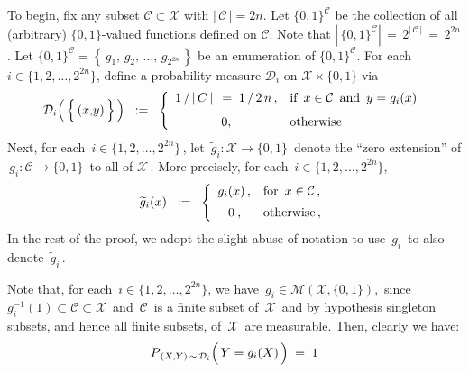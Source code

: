 \vskip 0.5cm
\noindent
To begin, fix any subset $\mathcal{C} \subset \mathcal{X}$ with $\vert\,\mathcal{C}\,\vert = 2n$.
Let $\{0,1\}^{\mathcal{C}}$ be the collection of all (arbitrary) $\{0,1\}$-valued functions defined on $\mathcal{C}$.
Note that $\left\vert\,\{0,1\}^{\mathcal{C}}\right\vert \,=\, 2^{\vert\,\mathcal{C}\,\vert} \, = \, 2^{2n}$.
Let $\{0,1\}^{\mathcal{C}} = \left\{\,g_{1},\, g_{2},\, \ldots,\, g_{2^{2n}}\,\right\}$ be an enumeration of $\{0,1\}^{\mathcal{C}}$.
For each $i \in \{1,2,\ldots,2^{2n}\}$, define a probability measure $\mathcal{D}_{i}$ on $\mathcal{X} \times \{0,1\}$ via
\begin{equation*}
\mathcal{D}_{i}\!\left(\,\left\{\,(x\overset{{\color{white}\vert}}{,}y)\,\right\}\,\right)
\;\; := \;\;
	\left\{\begin{array}{cl}
		1\,/\,\vert\,C\,\vert\, \;=\; 1\,/\,2\,n\,, & \textnormal{if \,$x \in \mathcal{C}$\, and \,$y = g_{i}(x)$} \\
		\overset{{\color{white}\vert}}{0}, & \textnormal{otherwise}
		\end{array}\right.
\end{equation*}
Next, for each \,$i \in \{1,2,\ldots,2^{2n}\}$\,, let
\,$\widetilde{g}_{i} : \mathcal{X} \longrightarrow \{0,1\}$\, denote the ``zero extension'' of
\,$g_{i} : \mathcal{C} \longrightarrow \{0,1\}$\, to all of $\mathcal{X}$\,.
More precisely, for each \,$i \in \{1,2,\ldots,2^{2n}\}$,
\begin{equation*}
\widetilde{g}_{i}(x)
\;\; := \;\;
	\left\{\begin{array}{cl}
	g_{i}(x)\,, & \textnormal{for \,$x \in \mathcal{C}$}\,,
	\\
	\overset{{\color{white}-}}{0}\,, & \textnormal{otherwise}\,,
	\end{array}\right.
\end{equation*}
In the rest of the proof, we adopt the slight abuse of notation to use \,$g_{i}$\, to also denote \,$\widetilde{g}_{i}$\,.

\vskip 0.5cm
\noindent
Note that, for each \,$i \in \{1,2,\ldots,2^{2n}\}$, we have \,$g_{i} \in \mathcal{M}(\mathcal{X},\{0,1\})$,\,
since \,$g_{i}^{-1}(1) \subset \mathcal{C} \subset \mathcal{X}$\, and \,$\mathcal{C}$\, is a finite subset of
\,$\mathcal{X}$\, and by hypothesis singleton subsets, and hence all finite subsets,
of \,$\mathcal{X}$\, are measurable.
Then, clearly we have:
\begin{equation*}
P_{\,(X,Y)\,\sim\,\mathcal{D}_{i}}\!\left(\,Y \overset{{\color{white}-}}{=} g_{i}(X)\,\right) \; = \; 1
\end{equation*}


